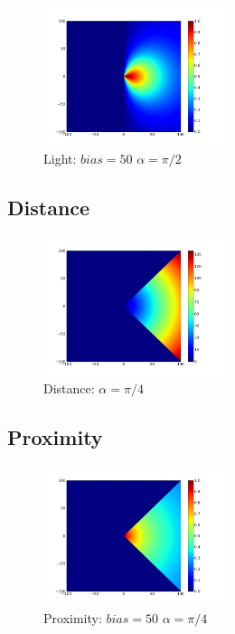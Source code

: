 \documentclass[a4paper]{article}
\begin{document}
\begin{figure}
	\vspace{-30pt}
	\begin{center}
		\includegraphics[width=0.48\textwidth]{graphs/light.png}
	\end{center}
	\vspace{-30pt}
	\caption{Light: $bias=50$ $\alpha=\pi/2$}
\end{figure}

\subsection{Distance}
\begin{figure}
	\vspace{-30pt}
	\begin{center}
		\includegraphics[width=0.48\textwidth]{graphs/distance.png}
	\end{center}
	\vspace{-30pt}
	\caption{Distance: $\alpha=\pi/4$}
\end{figure}

\subsection{Proximity}
\begin{figure}
	\vspace{-30pt}
	\begin{center}
		\includegraphics[width=0.48\textwidth]{graphs/proximity.png}
	\end{center}
	\vspace{-30pt}
	\caption{Proximity: $bias=50$ $\alpha=\pi/4$}
\end{figure}
\end{document}
